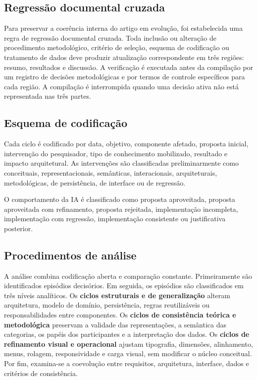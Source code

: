 \documentclass[preprint,12pt,authoryear]{elsarticle}
\begin{document}
\subsection{Regressão documental cruzada}
Para preservar a coerência interna do artigo em evolução, foi estabelecida uma regra de regressão documental cruzada. Toda inclusão ou alteração de procedimento metodológico, critério de seleção, esquema de codificação ou tratamento de dados deve produzir atualização correspondente em três regiões: resumo, resultados e discussão. A verificação é executada antes da compilação por um registro de decisões metodológicas e por termos de controle específicos para cada região. A compilação é interrompida quando uma decisão ativa não está representada nas três partes.

\subsection{Esquema de codificação}
Cada ciclo é codificado por data, objetivo, componente afetado, proposta inicial, intervenção do pesquisador, tipo de conhecimento mobilizado, resultado e impacto arquitetural. As intervenções são classificadas preliminarmente como conceituais, representacionais, semânticas, interacionais, arquiteturais, metodológicas, de persistência, de interface ou de regressão.

O comportamento da IA é classificado como proposta aproveitada, proposta aproveitada com refinamento, proposta rejeitada, implementação incompleta, implementação com regressão, implementação consistente ou justificativa posterior.

\subsection{Procedimentos de análise}
A análise combina codificação aberta e comparação constante. Primeiramente são identificados episódios decisórios. Em seguida, os episódios são classificados em três níveis analíticos. Os \textbf{ciclos estruturais e de generalização} alteram arquitetura, modelo de domínio, persistência, regras reutilizáveis ou responsabilidades entre componentes. Os \textbf{ciclos de consistência teórica e metodológica} preservam a validade das representações, a semântica das categorias, os papéis dos participantes e a interpretação dos dados. Os \textbf{ciclos de refinamento visual e operacional} ajustam tipografia, dimensões, alinhamento, menus, rolagem, responsividade e carga visual, sem modificar o núcleo conceitual. Por fim, examina-se a coevolução entre requisitos, arquitetura, interface, dados e critérios de consistência.
\end{document}
